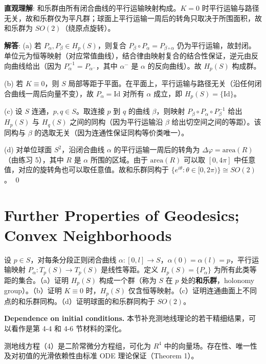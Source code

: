 \begin{solution}
\textbf{直观理解}: 和乐群由所有闭合曲线的平行运输映射构成。$K=0$ 时平行运输与路径无关，故和乐群仅为平凡群；球面上平行运输一周后的转角只取决于所围面积，故和乐群为 $SO(2)$（绕原点旋转）。

\textbf{解答}: (a) 若 $P_{\alpha}, P_{\beta} \in H_p(S)$，则复合 $P_{\beta}\circ P_{\alpha} = P_{\beta\circ\alpha}$ 仍为平行运输，故封闭。单位元为恒等映射（对应常值曲线），结合律由映射复合的结合性保证，逆元由反向曲线给出（因为 $P_{\alpha}^{-1} = P_{\alpha^-}$，其中 $\alpha^-$ 是 $\alpha$ 的反向曲线）。故 $H_p(S)$ 构成群。

(b) 若 $K\equiv 0$，则 $S$ 局部等距于平面。在平面上，平行运输与路径无关（沿任何闭合曲线一周后向量不变），故 $P_{\alpha} = \mathrm{Id}$ 对所有 $\alpha$ 成立，即 $H_p(S) = \{\mathrm{Id}\}$。

(c) 设 $S$ 连通，$p,q \in S$。取连接 $p$ 到 $q$ 的曲线 $\beta$，则映射 $P_{\beta}\circ P_{\alpha}\circ P_{\beta}^{-1}$ 给出 $H_p(S)$ 与 $H_q(S)$ 之间的同构（因为平行运输沿 $\beta$ 给出切空间之间的等距）。该同构与 $\beta$ 的选取无关（因为连通性保证同构等价类唯一）。

(d) 对单位球面 $S^2$，沿闭合曲线 $\alpha$ 的平行运输一周后的转角为 $\Delta\varphi = \mathrm{area}(R)$（由练习 5），其中 $R$ 是 $\alpha$ 所围的区域。由于 $\mathrm{area}(R)$ 可以取 $[0,4\pi]$ 中任意值，对应的旋转角也可以取任意值。故和乐群同构于 $\{e^{i\theta}: \theta \in [0,2\pi)\} \cong SO(2)$。
\qed
\end{solution}

\section{Further Properties of Geodesics; Convex Neighborhoods}\label{sec:further-geodesics}
设 $p \in S$，对每条分段正则闭合曲线 $\alpha: [0,l] \to S$，$\alpha(0)=\alpha(l)=p$，平行运输映射 $P_\alpha: T_p(S) \to T_p(S)$ 是线性等距。定义 $H_p(S) = \{P_\alpha\}$ 为所有此类等距的集合。（a）证明 $H_p(S)$ 构成一个群（称为 $S$ 在 $p$ 处的\textbf{和乐群}，holonomy group）。（b）证明 $K\equiv 0$ 时，$H_p(S)$ 仅含恒等映射。（c）证明连通曲面上不同点的和乐群同构。（d）证明球面的和乐群同构于 $SO(2)$。


\textbf{Dependence on initial conditions.} 本节补充测地线理论的若干精细结果，可以看作是第 4-4 和 4-6 节材料的深化。

测地线方程（4）是二阶常微分方程组，可化为 $R^4$ 中的向量场。存在性、唯一性及对初值的光滑依赖性由标准 ODE 理论保证（Theorem 1）。

